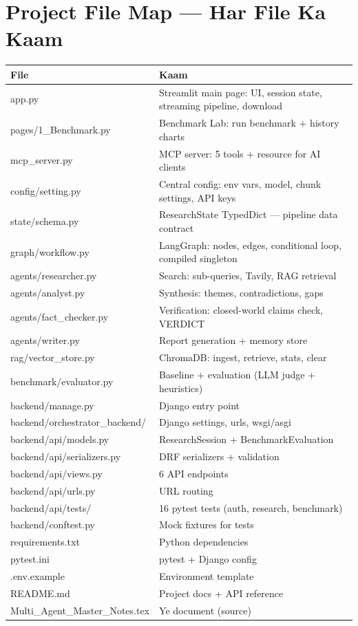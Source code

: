 \section{Project File Map --- Har File Ka Kaam}

\begin{longtable}{p{5.2cm} p{9.2cm}}
\toprule
\textbf{File} & \textbf{Kaam} \\
\midrule
app.py & Streamlit main page: UI, session state, streaming pipeline, download \\
pages/1\_Benchmark.py & Benchmark Lab: run benchmark + history charts \\
mcp\_server.py & MCP server: 5 tools + resource for AI clients \\
config/setting.py & Central config: env vars, model, chunk settings, API keys \\
state/schema.py & ResearchState TypedDict --- pipeline data contract \\
graph/workflow.py & LangGraph: nodes, edges, conditional loop, compiled singleton \\
agents/researcher.py & Search: sub-queries, Tavily, RAG retrieval \\
agents/analyst.py & Synthesis: themes, contradictions, gaps \\
agents/fact\_checker.py & Verification: closed-world claims check, VERDICT \\
agents/writer.py & Report generation + memory store \\
rag/vector\_store.py & ChromaDB: ingest, retrieve, stats, clear \\
benchmark/evaluator.py & Baseline + evaluation (LLM judge + heuristics) \\
backend/manage.py & Django entry point \\
backend/orchestrator\_backend/ & Django settings, urls, wsgi/asgi \\
backend/api/models.py & ResearchSession + BenchmarkEvaluation \\
backend/api/serializers.py & DRF serializers + validation \\
backend/api/views.py & 6 API endpoints \\
backend/api/urls.py & URL routing \\
backend/api/tests/ & 16 pytest tests (auth, research, benchmark) \\
backend/conftest.py & Mock fixtures for tests \\
requirements.txt & Python dependencies \\
pytest.ini & pytest + Django config \\
.env.example & Environment template \\
README.md & Project docs + API reference \\
Multi\_Agent\_Master\_Notes.tex & Ye document (source) \\
\bottomrule
\end{longtable}

